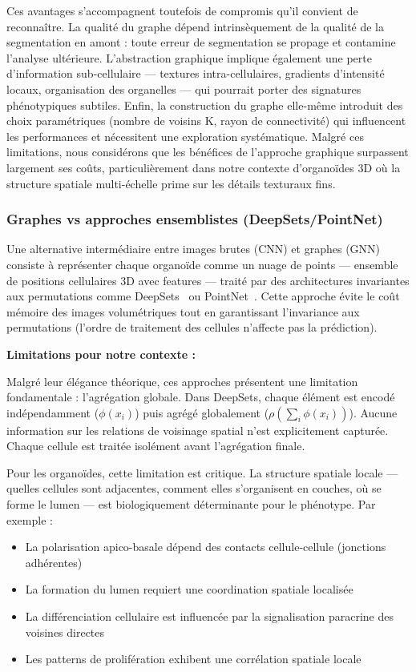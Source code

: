 Ces avantages s'accompagnent toutefois de compromis qu'il convient de reconnaître. La qualité du graphe dépend intrinsèquement de la qualité de la segmentation en amont : toute erreur de segmentation se propage et contamine l'analyse ultérieure. L'abstraction graphique implique également une perte d'information sub-cellulaire — textures intra-cellulaires, gradients d'intensité locaux, organisation des organelles — qui pourrait porter des signatures phénotypiques subtiles. Enfin, la construction du graphe elle-même introduit des choix paramétriques (nombre de voisins K, rayon de connectivité) qui influencent les performances et nécessitent une exploration systématique. Malgré ces limitations, nous considérons que les bénéfices de l'approche graphique surpassent largement ses coûts, particulièrement dans notre contexte d'organoïdes 3D où la structure spatiale multi-échelle prime sur les détails texturaux fins.

\subsubsection{Graphes vs approches ensemblistes (DeepSets/PointNet)}

Une alternative intermédiaire entre images brutes (CNN) et graphes (GNN) consiste à représenter chaque organoïde comme un nuage de points — ensemble de positions cellulaires 3D avec features — traité par des architectures invariantes aux permutations comme DeepSets~\cite{Zaheer2017} ou PointNet~\cite{Qi2017}. Cette approche évite le coût mémoire des images volumétriques tout en garantissant l'invariance aux permutations (l'ordre de traitement des cellules n'affecte pas la prédiction).

\textbf{Limitations pour notre contexte :}

Malgré leur élégance théorique, ces approches présentent une limitation fondamentale : l'agrégation globale. Dans DeepSets, chaque élément est encodé indépendamment ($\phi(x_i)$) puis agrégé globalement ($\rho(\sum_i \phi(x_i))$). Aucune information sur les relations de voisinage spatial n'est explicitement capturée. Chaque cellule est traitée isolément avant l'agrégation finale.

Pour les organoïdes, cette limitation est critique. La structure spatiale locale — quelles cellules sont adjacentes, comment elles s'organisent en couches, où se forme le lumen — est biologiquement déterminante pour le phénotype. Par exemple :
\begin{itemize}
    \item La polarisation apico-basale dépend des contacts cellule-cellule (jonctions adhérentes)
    \item La formation du lumen requiert une coordination spatiale localisée
    \item La différenciation cellulaire est influencée par la signalisation paracrine des voisines directes
    \item Les patterns de prolifération exhibent une corrélation spatiale locale
\end{itemize}

